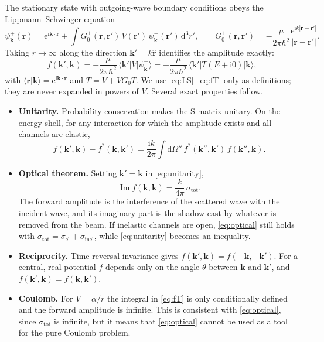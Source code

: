 \documentclass[11pt,a4paper]{book}
\numberwithin{equation}{chapter}
\newcommand{\dd}{\mathrm{d}}
\newcommand{\ii}{\mathrm{i}}
\newcommand{\ee}{\mathrm{e}}
\newcommand{\vk}{\bm{k}}
\newcommand{\vr}{\bm{r}}
\newcommand{\Imag}{\operatorname{Im}}
\begin{document}
The stationary state with outgoing-wave boundary conditions obeys the
Lippmann--Schwinger equation
\begin{equation}\label{eq:LS}
  \psi^+_{\vk}(\vr)=\ee^{\ii\vk\cdot\vr}+\int G_0^+(\vr,\vr')\,V(\vr')\,
  \psi^+_{\vk}(\vr')\,\dd^3r',\qquad
  G_0^+(\vr,\vr')=-\frac{\mu}{2\pi\hbar^2}\frac{\ee^{\ii k|\vr-\vr'|}}{|\vr-\vr'|}.
\end{equation}
Taking $r\to\infty$ along the direction $\vk'=k\hat{\vr}$ identifies the
amplitude exactly:
\begin{equation}\label{eq:fT}
  f(\vk',\vk)=-\frac{\mu}{2\pi\hbar^2}\,\langle\vk'|V|\psi^+_{\vk}\rangle
  =-\frac{\mu}{2\pi\hbar^2}\,\langle\vk'|T(E+\ii0)|\vk\rangle ,
\end{equation}
with $\langle\vr|\vk\rangle=\ee^{\ii\vk\cdot\vr}$ and $T=V+VG_0T$. We use
\eqref{eq:LS}--\eqref{eq:fT} only as definitions; they are never expanded in
powers of $V$. Several exact properties follow.
\begin{itemize}
  \item \textbf{Unitarity.} Probability conservation makes the S-matrix unitary.
        On the energy shell, for any interaction for which the amplitude exists
        and all channels are elastic,
        \begin{equation}\label{eq:unitarity}
          f(\vk',\vk)-f^*(\vk,\vk')=\frac{\ii k}{2\pi}\int\dd\Omega''\,
          f^*(\vk'',\vk')\,f(\vk'',\vk).
        \end{equation}
  \item \textbf{Optical theorem.} Setting $\vk'=\vk$ in \eqref{eq:unitarity},
        \begin{equation}\label{eq:optical}
          \Imag f(\vk,\vk)=\frac{k}{4\pi}\,\sigma_{\mathrm{tot}} .
        \end{equation}
        The forward amplitude is the interference of the scattered wave with
        the incident wave, and its imaginary part is the shadow cast by
        whatever is removed from the beam. If inelastic channels are open,
        \eqref{eq:optical} still holds with
        $\sigma_{\mathrm{tot}}=\sigma_{\mathrm{el}}+\sigma_{\mathrm{inel}}$,
        while \eqref{eq:unitarity} becomes an inequality.
  \item \textbf{Reciprocity.} Time-reversal invariance gives
        $f(\vk',\vk)=f(-\vk,-\vk')$. For a central, real potential $f$ depends
        only on the angle $\theta$ between $\vk$ and $\vk'$, and
        $f(\vk',\vk)=f(\vk,\vk')$.
  \item \textbf{Coulomb.} For $V=\alpha/r$ the integral in \eqref{eq:fT} is only
        conditionally defined and the forward amplitude is infinite. This is
        consistent with \eqref{eq:optical}, since $\sigma_{\mathrm{tot}}$ is
        infinite, but it means that \eqref{eq:optical} cannot be used as a
        tool for the pure Coulomb problem.
\end{itemize}
\end{document}
